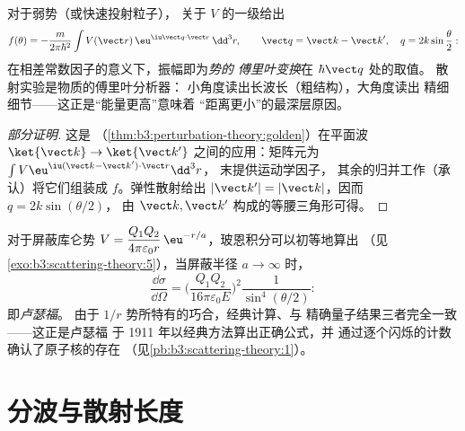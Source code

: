 \begin{theorem}[玻恩近似]\label{thm:b3:scattering-theory:born}
对于弱势（或快速投射粒子），
关于 $V$ 的一级给出
\[
f(\theta) = -\frac{m}{2\pi\hbar^2}
\int V(\vect r)\,\eu^{\iu\vect q\cdot\vect r}\,\dd^3r ,
\qquad
\vect q = \vect k - \vect k' , \quad
q = 2k\sin\frac\theta2 :
\]
在相差常数因子的意义下，振幅即为\emph{势的
傅里叶变换}在 $\hbar\vect q$ 处的取值。
散射实验是物质的傅里叶分析器：
小角度读出长波长（粗结构），大角度读出
精细细节——这正是“能量更高”意味着
“距离更小”的最深层原因。
\end{theorem}

\begin{proof}[部分证明]
这是
（\cref{thm:b3:perturbation-theory:golden}）在平面波
$\ket{\vect k} \to \ket{\vect k'}$ 之间的应用：矩阵元为
$\int V\eu^{\iu(\vect k - \vect k')\cdot\vect r}\dd^3r$，
末提供运动学因子，
其余的归并工作（承认）将它们组装成 $f$。弹性散射给出
$|\vect k'| = |\vect k|$，因而 $q = 2k\sin(\theta/2)$，
由 $\vect k, \vect k'$ 构成的等腰三角形可得。
\end{proof}

\begin{example}[从汤川势到卢瑟福散射]\label{ex:b3:scattering-theory:rutherford}
对于屏蔽库仑势 $V = \dfrac{Q_1Q_2}{4\pi
\varepsilon_0 r}\,\eu^{-r/a}$，玻恩积分可以初等地算出
（见\cref{exo:b3:scattering-theory:5}），当屏蔽半径
$a \to \infty$ 时，
\[
\frac{\dd\sigma}{\dd\Omega} =
\Big(\frac{Q_1Q_2}{16\pi\varepsilon_0 E}\Big)^2
\frac{1}{\sin^4(\theta/2)} :
\]
即\emph{卢瑟福}。
由于 $1/r$ 势所特有的巧合，经典计算、与
精确量子结果三者完全一致——这正是卢瑟福
于 1911 年以经典方法算出正确公式，并
通过逐个闪烁的计数确认了原子核的存在
（见\cref{pb:b3:scattering-theory:1}）。
\end{example}

\section{分波与散射长度}

